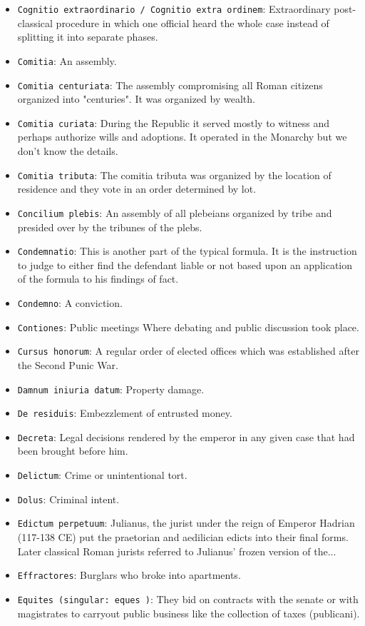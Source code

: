 \documentclass[11pt]{article}
\begin{document}
\begin{itemize}
\item \texttt{Cognitio extraordinario / Cognitio extra ordinem}: Extraordinary post-classical procedure in which one official heard the whole case instead of splitting it into separate phases.
\item \texttt{Comitia}: An assembly.
\item \texttt{Comitia centuriata}: The assembly compromising all Roman citizens organized into "centuries". It was organized by wealth.
\item \texttt{Comitia curiata}: During the Republic it served mostly to witness and perhaps authorize wills and adoptions. It operated in the Monarchy but we don't know the details.
\item \texttt{Comitia tributa}: The comitia tributa was organized by the location of residence and they vote in an order determined by lot.
\item \texttt{Concilium plebis}: An assembly of all plebeians organized by tribe and presided over by the tribunes of the plebs.
\item \texttt{Condemnatio}: This is another part of the typical formula. It is the instruction to judge to either find the defendant liable or not based upon an application of the formula to his findings of fact.
\item \texttt{Condemno}: A conviction.
\item \texttt{Contiones}: Public meetings Where debating and public discussion took place.
\item \texttt{Cursus honorum}: A regular order of elected offices which was established after the Second Punic War.
\item \texttt{Damnum iniuria datum}: Property damage.
\item \texttt{De residuis}: Embezzlement of entrusted money.
\item \texttt{Decreta}: Legal decisions rendered by the emperor in any given case that had been brought before him.
\item \texttt{Delictum}: Crime or unintentional tort.
\item \texttt{Dolus}: Criminal intent.
\item \texttt{Edictum perpetuum}: Julianus, the jurist under the reign of Emperor Hadrian (117-138 CE) put the praetorian and aedilician edicts into their final forms. Later classical Roman jurists referred to Julianus' frozen version of the...
\item \texttt{Effractores}: Burglars who broke into apartments.
\item \texttt{Equites (singular: eques )}: They bid on contracts with the senate or with magistrates to carryout public business like the collection of taxes (publicani).

\end{itemize}
\end{document}
